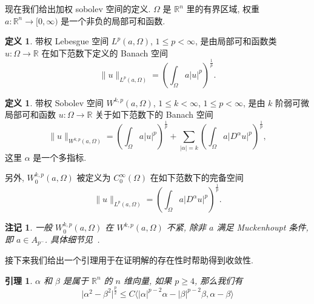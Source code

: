 \documentclass[twoside,longtitle]{LZUthesis}
\newtheorem{lemma}[theorem]{引理}
\newtheorem{remark}[theorem]{注记}
\theoremstyle{definition}
\newtheorem{definition}[theorem]{定义}
\numberwithin{equation}{chapter}
\newcommand*\abs[1]{\lvert#1\rvert}
\newcommand*\norm[1]{\lVert#1\rVert}
\newcommand\R{\mathbb{R}}
\begin{document}
现在我们给出加权 sobolev 空间的定义.
$\Omega$ 是 $\R^n$ 里的有界区域, 权重
$a \colon \R^n \to [0, \infty)$
是一个非负的局部可和函数.
\begin{definition}
	带权 Lebesgue 空间 $L^p(a, \Omega)$, $1 \leq p < \infty$,
	是由局部可和函数类
	$u \colon \Omega \to \R$ 在如下范数下定义的 Banach 空间
	\begin{equation}
		\norm{u}_{L^p(a,\Omega)} =
		\left( \int_{\Omega}a\abs{u}^p \right)^{\frac{1}{p}}.
	\end{equation}
\end{definition}
\begin{definition}
	带权 Sobolev 空间 $W^{k,p}(a,\Omega)$,
	$1 \leq k < \infty$, $1 \leq p < \infty$,
	是由 $k$ 阶弱可微局部可和函数
	$u \colon \Omega \to \R$ 关于如下范数下的 Banach 空间
	\begin{equation}
		\norm{u}_{W^{k,p}(a,\Omega)} =
		\left( \int_{\Omega}a\abs{u}^p \right)^{\frac{1}{p}}
		+ \sum_{\abs{\alpha}=k}
		\left( \int_{\Omega}a\abs{D^{\alpha}u}^p \right)^{\frac{1}{p}},
	\end{equation}
	这里 $\alpha$ 是一个多指标.
	
	另外,
	$W_0^{k,p}(a,\Omega)$ 被定义为
	$C_0^{\infty}(\Omega)$ 在如下范数下的完备空间
	\begin{equation}
		\norm{u}_{L^p(a,\Omega)} =
		\left( \int_{\Omega}a\abs{D^{\alpha}u}^p \right)^{\frac{1}{p}}.
	\end{equation}
\end{definition}
\begin{remark}
	一般 $W_0^{k,p}(a,\Omega)$ 在
	$W^{k,p}(a,\Omega)$ 不紧, 除非 $a$ 满足 Muckenhoupt 条件, 即 $a \in A_{p^-}$. 具体细节见~\cite{goldshteinWeightedSobolevSpaces2009}.
\end{remark}
接下来我们给出一个引理用于在证明解的存在性时帮助得到收敛性.
\begin{lemma}\label{lem:VecIneq}
	$\alpha$ 和 $\beta$ 是属于 $\R^{n}$ 的 $n$ 维向量, 如果 $p \geq 4$, 那么我们有
	\begin{equation}
		\abs{\alpha^2 - \beta^2}^{\frac{p}{2}}
		\leq C \langle \abs{\alpha}^{p-2}\alpha - \abs{\beta}^{p-2}\beta, \alpha-\beta\rangle
	\end{equation}
\end{lemma}
\end{document}
